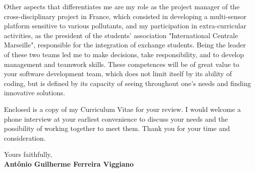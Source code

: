 \documentclass[11pt]{article}
\begin{document}
Other aspects that differentiates me are my role as the project manager of the cross-disciplinary project in France, which consisted in developing a multi-sensor platform sensitive to various pollutants, and my participation in extra-curricular activities, as the president of the students' association "International Centrale Marseille", responsible for the integration of exchange students. Being the leader of these two teams led me to make decisions, take responsibility, and to develop management and teamwork skills. These competences will be of great value to your software development team, which does not limit itself by its ability of coding, but is defined by its capacity of seeing throughout one's needs and finding innovative solutions. \vspace{0.75em}

Enclosed is a copy of my Curriculum Vitae for your review. I would welcome a phone interview at your earliest convenience to discuss your needs and the possibility of working together to meet them. Thank you for your time and consideration. \vspace{0.75em}

  
Yours faithfully,\\[2em] %
%
{\bfseries Antônio Guilherme Ferreira Viggiano}\\
%
\vfill%
\end{document}
